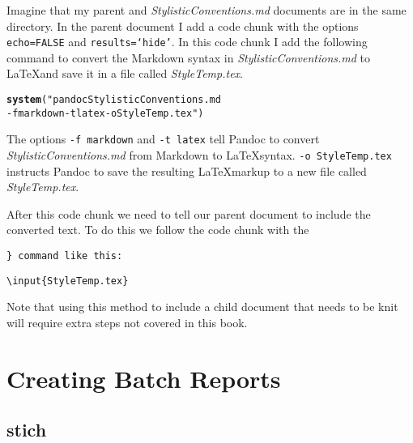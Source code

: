 \documentclass[ChapterTOCs,krantz1]{krantz}\usepackage{graphicx, color}
\makeatletter
\newcommand{\hlfunctioncall}[1]{\textcolor[rgb]{0.501960784313725,0,0.329411764705882}{\textbf{#1}}}%
\newenvironment{kframe}{%
 \def\at@end@of@kframe{}%
 \ifinner\ifhmode%
  \def\at@end@of@kframe{\end{minipage}}%
  \begin{minipage}{\columnwidth}%
 \fi\fi%
 \def\FrameCommand##1{\hskip\@totalleftmargin \hskip-\fboxsep
 \colorbox{shadecolor}{##1}\hskip-\fboxsep
     \hskip-\linewidth \hskip-\@totalleftmargin \hskip\columnwidth}%
 \MakeFramed {\advance\hsize-\width
   \@totalleftmargin\z@ \linewidth\hsize
   \@setminipage}}%
 {\par\unskip\endMakeFramed%
 \at@end@of@kframe}
\newenvironment{knitrout}{}{} %
\makeatother
\begin{document}
Imagine that my parent and {\emph{StylisticConventions.md}} documents are in the same directory. In the parent document I add a code chunk with the options {\tt{echo=FALSE}} and {\tt{results=`hide'}}. In this code chunk I add the following command to convert the Markdown syntax in {\emph{StylisticConventions.md}} to \LaTeX and save it in a file called {\emph{StyleTemp.tex}}.

\begin{knitrout}
\color{fgcolor}\begin{kframe}
\begin{alltt}
\hlfunctioncall{system}("pandoc StylisticConventions.md
        -f markdown -t latex -o StyleTemp.tex")
\end{alltt}
\end{kframe}
\end{knitrout}


\noindent The options {\tt{-f markdown}} and {\tt{-t latex}} tell Pandoc to convert {\emph{StylisticConventions.md}} from Markdown to \LaTeX syntax. {\tt{-o StyleTemp.tex}} instructs Pandoc to save the resulting \LaTeX markup to a new file called {\emph{StyleTemp.tex}}. 

After this code chunk we need to tell our parent document to include the converted text. To do this we follow the code chunk with the {\tt{\}} command like this:

\begin{knitrout}
\color{fgcolor}\begin{kframe}
\begin{alltt}
\textbackslash{}input\{StyleTemp.tex\}
\end{alltt}
\end{kframe}
\end{knitrout}


\noindent Note that using this method to include a child document that needs to be knit will require extra steps not covered in this book.


\section{Creating Batch Reports}

\subsection{stich}
\end{document}
